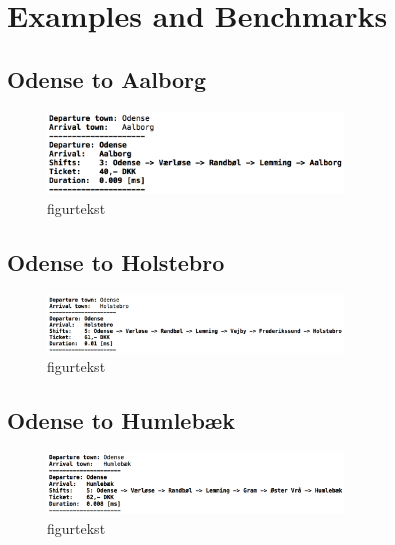 \section{Examples and Benchmarks}



\subsection{Odense to Aalborg}
\begin{figure}[th!]
\centering
\includegraphics[width=0.7\textwidth]{./graphics/ex1}
\caption[tekst i indholdsfortegnelsen]{figurtekst}
\label{fig:}
\end{figure}

	
\subsection{Odense to Holstebro}
\begin{figure}[th!]
\centering
\includegraphics[width=0.7\textwidth]{./graphics/ex2}
\caption[tekst i indholdsfortegnelsen]{figurtekst}
\label{fig:}
\end{figure}

\subsection{Odense to Humlebæk}
\begin{figure}[th!]
\centering
\includegraphics[width=0.7\textwidth]{./graphics/ex3}
\caption[tekst i indholdsfortegnelsen]{figurtekst}
\label{fig:}
\end{figure}






